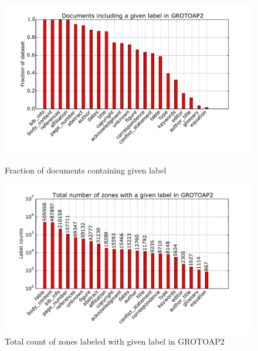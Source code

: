 
\begin{figure}
\centering
\begin{minipage}[t!]{\linewidth}
  \centerline{\includegraphics[width=18cm]{plots/docs_with_labels_barplot}}
  \caption{Fraction of documents containing given label}
  \label{fig:label_barplot}
\end{minipage}
\begin{minipage}[t!]{\linewidth}
  \centerline{\includegraphics[width=18cm]{plots/label_barplot}}
  \caption{Total count of zones labeled with given label in GROTOAP2}
  \label{fig:label_count_barplot}
\end{minipage}
\end{figure}

